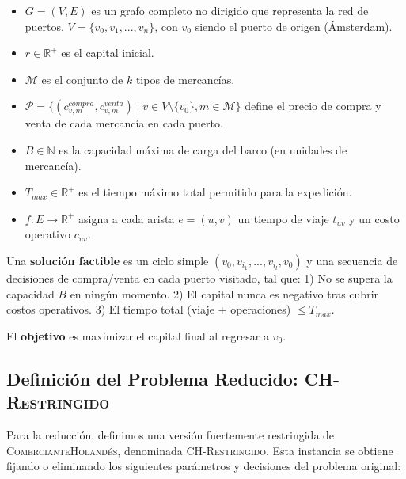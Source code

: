 \documentclass{article}
\begin{document}
\begin{itemize} 
    \item $G=(V, E)$ es un grafo completo no dirigido que representa la red de puertos. $V = \{v_0, v_1, ..., v_n\}$, con $v_0$ siendo el puerto de origen (Ámsterdam). 
    \item $r \in \mathbb{R}^+$ es el capital inicial.
    \item $\mathcal{M}$ es el conjunto de $k$ tipos de mercancías. 
    \item $\mathcal{P} = \{ (c^{compra}_{v,m}, c^{venta}_{v,m}) \mid v \in V \setminus \{v_0\}, m \in \mathcal{M} \}$ define el precio de compra y venta de cada mercancía en cada puerto. 
    \item $B \in \mathbb{N}$ es la capacidad máxima de carga del barco (en unidades de mercancía). 
    \item $T_{max} \in \mathbb{R}^+$ es el tiempo máximo total permitido para la expedición. 
    \item $f: E \rightarrow \mathbb{R}^+$ asigna a cada arista $e=(u,v)$ un tiempo de viaje $t_{uv}$ y un costo operativo $c_{uv}$. 
\end{itemize}

Una \textbf{solución factible} es un ciclo simple $(v_0, v_{i_1}, ..., v_{i_l}, v_0)$ y una secuencia de decisiones de compra/venta en cada puerto visitado, tal que: 
1) No se supera la capacidad $B$ en ningún momento. 
2) El capital nunca es negativo tras cubrir costos operativos. 
3) El tiempo total (viaje + operaciones) $\leq T_{max}$.

El \textbf{objetivo} es maximizar el capital final al regresar a $v_0$.

\subsection{Definición del Problema Reducido: \textsc{CH-Restringido}}
\label{subsec:def_ch_rest}

Para la reducción, definimos una versión fuertemente restringida de \textsc{ComercianteHolandés}, denominada \textsc{CH-Restringido}. Esta instancia se obtiene fijando o eliminando los siguientes parámetros y decisiones del problema original:
\end{document}
